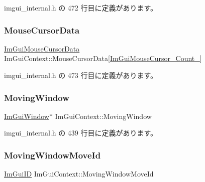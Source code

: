 imgui\+\_\+internal.\+h の 472 行目に定義があります。

\mbox{\label{struct_im_gui_context_a244c1b68fdb7da04de90d5becd5a5777}} 
\subsubsection{\texorpdfstring{Mouse\+Cursor\+Data}{MouseCursorData}}
{\footnotesize\ttfamily \mbox{\hyperlink{struct_im_gui_mouse_cursor_data}{Im\+Gui\+Mouse\+Cursor\+Data}} Im\+Gui\+Context\+::\+Mouse\+Cursor\+Data\mbox{[}\mbox{\hyperlink{imgui_8h_a2eb1181cc1d7872a061df8731141dde9aa2c8807fa1d95bf43b63b3bd946b3fd0}{Im\+Gui\+Mouse\+Cursor\+\_\+\+Count\+\_\+}}\mbox{]}}



 imgui\+\_\+internal.\+h の 473 行目に定義があります。

\mbox{\label{struct_im_gui_context_a28078cc22f615213fd8544016cd6ae20}} 
\subsubsection{\texorpdfstring{Moving\+Window}{MovingWindow}}
{\footnotesize\ttfamily \mbox{\hyperlink{struct_im_gui_window}{Im\+Gui\+Window}}$\ast$ Im\+Gui\+Context\+::\+Moving\+Window}



 imgui\+\_\+internal.\+h の 439 行目に定義があります。

\mbox{\label{struct_im_gui_context_abfd9589ba8b4d6b78bd24d46696ed820}} 
\subsubsection{\texorpdfstring{Moving\+Window\+Move\+Id}{MovingWindowMoveId}}
{\footnotesize\ttfamily \mbox{\hyperlink{imgui_8h_a1785c9b6f4e16406764a85f32582236f}{Im\+Gui\+ID}} Im\+Gui\+Context\+::\+Moving\+Window\+Move\+Id}




